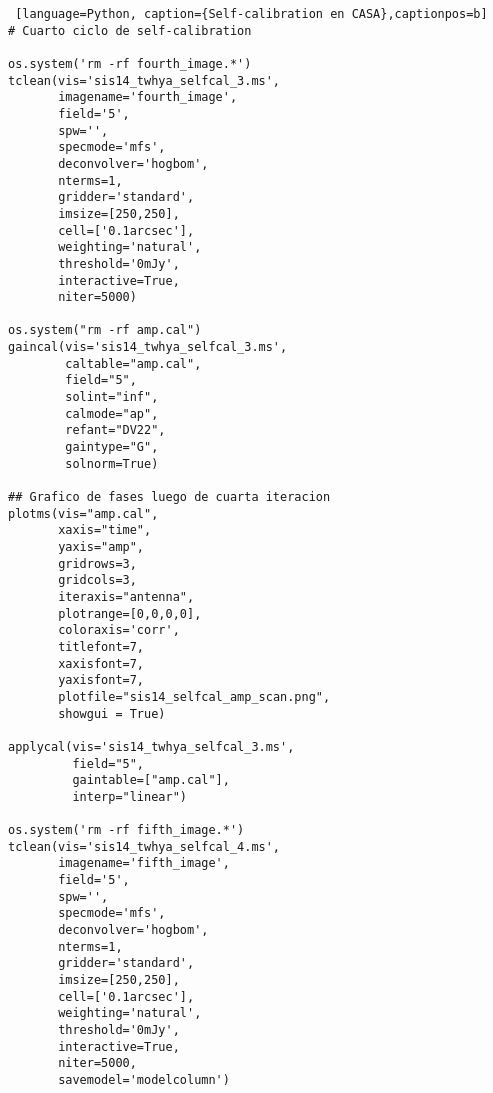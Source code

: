 \begin{lstlisting} [language=Python, caption={Self-calibration en CASA},captionpos=b]
# Cuarto ciclo de self-calibration

os.system('rm -rf fourth_image.*')
tclean(vis='sis14_twhya_selfcal_3.ms',
       imagename='fourth_image',
       field='5',
       spw='',
       specmode='mfs',
       deconvolver='hogbom',
       nterms=1,
       gridder='standard',
       imsize=[250,250],
       cell=['0.1arcsec'],
       weighting='natural',
       threshold='0mJy',
       interactive=True,
       niter=5000)

os.system("rm -rf amp.cal")
gaincal(vis='sis14_twhya_selfcal_3.ms',
        caltable="amp.cal",
        field="5",
        solint="inf",
        calmode="ap",
        refant="DV22",
        gaintype="G",
        solnorm=True)

## Grafico de fases luego de cuarta iteracion 
plotms(vis="amp.cal", 
       xaxis="time", 
       yaxis="amp", 
       gridrows=3, 
       gridcols=3, 
       iteraxis="antenna", 
       plotrange=[0,0,0,0],
       coloraxis='corr',
       titlefont=7, 
       xaxisfont=7, 
       yaxisfont=7, 
       plotfile="sis14_selfcal_amp_scan.png",  
       showgui = True)

applycal(vis='sis14_twhya_selfcal_3.ms',
         field="5",
         gaintable=["amp.cal"],
         interp="linear")

os.system('rm -rf fifth_image.*')
tclean(vis='sis14_twhya_selfcal_4.ms',
       imagename='fifth_image',
       field='5',
       spw='',
       specmode='mfs',
       deconvolver='hogbom',
       nterms=1,
       gridder='standard',
       imsize=[250,250],
       cell=['0.1arcsec'],
       weighting='natural',
       threshold='0mJy',
       interactive=True,
       niter=5000,
       savemodel='modelcolumn')
\end{lstlisting}
